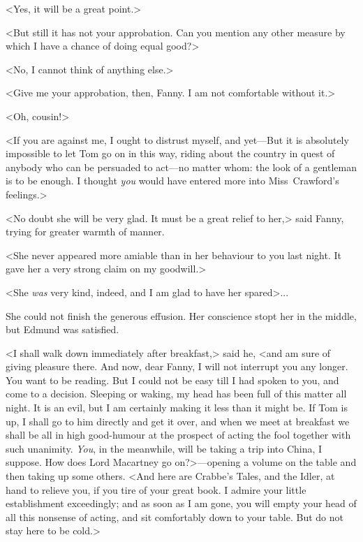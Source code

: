 <Yes, it will be a great point.>

<But still it has not your approbation. Can you mention any other measure by which I have a chance of doing equal good?>

<No, I cannot think of anything else.>

<Give me your approbation, then, Fanny. I am not comfortable without it.>

<Oh, cousin!>

<If you are against me, I ought to distrust myself, and yet—But it is absolutely impossible to let Tom go on in this way, riding about the country in quest of anybody who can be persuaded to act—no matter whom: the look of a gentleman is to be enough. I thought \textit{you}  would have entered more into Miss~Crawford's feelings.>

<No doubt she will be very glad. It must be a great relief to her,> said Fanny, trying for greater warmth of manner.

<She never appeared more amiable than in her behaviour to you last night. It gave her a very strong claim on my goodwill.>

<She \textit{was}  very kind, indeed, and I am glad to have her spared>...

She could not finish the generous effusion. Her conscience stopt her in the middle, but Edmund was satisfied.

<I shall walk down immediately after breakfast,> said he, <and am sure of giving pleasure there. And now, dear Fanny, I will not interrupt you any longer. You want to be reading. But I could not be easy till I had spoken to you, and come to a decision. Sleeping or waking, my head has been full of this matter all night. It is an evil, but I am certainly making it less than it might be. If Tom is up, I shall go to him directly and get it over, and when we meet at breakfast we shall be all in high good-humour at the prospect of acting the fool together with such unanimity. \textit{You}, in the meanwhile, will be taking a trip into China, I suppose. How does Lord Macartney go on?>—opening a volume on the table and then taking up some others. <And here are Crabbe's Tales, and the Idler, at hand to relieve you, if you tire of your great book. I admire your little establishment exceedingly; and as soon as I am gone, you will empty your head of all this nonsense of acting, and sit comfortably down to your table. But do not stay here to be cold.>

